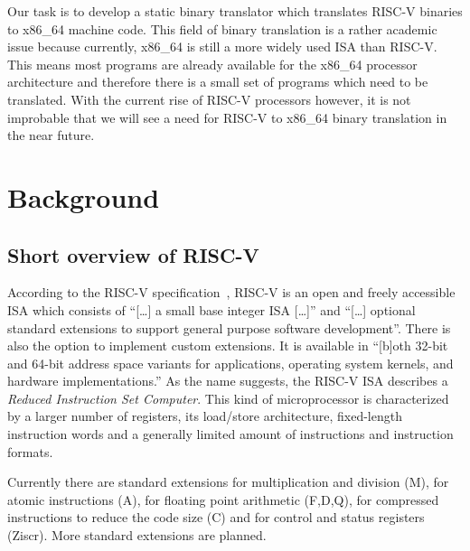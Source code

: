\documentclass[course=eragp]{aspdoc}
\begin{document}
\par


\par

Our task is to develop a static binary translator which translates RISC-V binaries to x86\_64
machine code. This field of binary translation is a rather academic issue because currently, x86\_64
is still a more widely used ISA than RISC-V.\cite{riscv_rises} This means most programs are already
available for the x86\_64 processor architecture and therefore there is a small set of
programs which need to be translated. With the current rise of RISC-V processors however, it is not
improbable that we will see a need for RISC-V to x86\_64 binary translation in the near future.

\section{Background}
\subsection{Short overview of RISC-V}

According to the RISC-V specification~\cite{rvspec}, RISC-V is an open and freely accessible ISA
which consists of ``[\ldots] a small base integer ISA [\ldots]'' and ``[\ldots] optional standard
extensions to support general purpose software development''\cite[p.~1]{rvspec}. There is also the
option to implement custom extensions. It is available in ``[b]oth 32-bit and 64-bit address space
variants for applications, operating system kernels, and hardware
implementations.''\cite[p.~1]{rvspec} As the name suggests, the RISC-V ISA describes a \emph{Reduced
    Instruction Set Computer}. This kind of microprocessor is characterized by a larger number of
registers, its load/store architecture, fixed-length instruction words and a generally limited
amount of instructions and instruction formats.\cite{RISCvCISC}

\par

Currently there are standard extensions for multiplication and division (M), for atomic instructions
(A), for floating point arithmetic (F,D,Q), for compressed instructions to reduce the code size (C)
and for control and status registers (Ziscr). More standard extensions are planned.\cite{rvspec}
\end{document}
